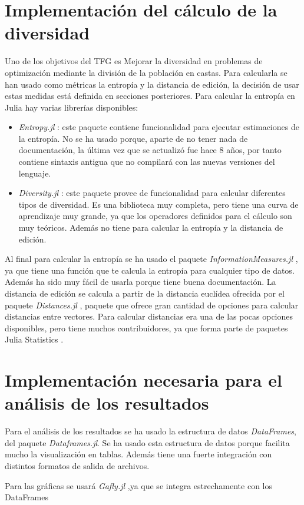 \section{Implementación del cálculo de la diversidad}

Uno de los objetivos del TFG es Mejorar la diversidad en problemas de optimización mediante la división de la población en castas.
Para calcularla se han usado como métricas la entropía y la distancia de edición, la decisión de usar estas medidas
está definida en secciones posteriores. Para calcular la entropía en Julia hay varias librerías disponibles:

\begin{itemize}
    \item \emph{Entropy.jl} \cite{entropy_jl}: este paquete contiene funcionalidad para ejecutar estimaciones de la entropía. No se ha usado porque,
    aparte de no tener nada de documentación, la última vez que se actualizó fue hace 8 años, por tanto contiene
    sintaxis antigua que no compilará con las nuevas versiones del lenguaje.
    \item \emph{Diversity.jl} \cite{diversity_jl}: este paquete provee de funcionalidad para calcular diferentes
    tipos de diversidad. Es una biblioteca muy completa, pero tiene una curva de aprendizaje muy grande, ya que los
    operadores definidos para el cálculo son muy teóricos. Además no tiene para calcular la entropía y la distancia
    de edición.
\end{itemize}

Al final para calcular la entropía se ha usado el paquete \emph{InformationMeasures.jl} \cite{informationMeasures_jl}, ya 
que tiene una función que te calcula la entropía para cualquier tipo de datos. Además ha sido muy fácil de usarla porque 
tiene buena documentación. La distancia de edición se calcula a partir de la distancia euclídea ofrecida por el paquete
\emph{Distances.jl} \cite{distances_jl}, paquete que ofrece gran cantidad de opciones para calcular distancias entre vectores.
Para calcular distancias era una de las pocas opciones disponibles, pero tiene muchos contribuidores, ya que forma 
parte de paquetes Julia Statistics \cite{stats_jl}.

\section{Implementación necesaria para el análisis de los resultados}

Para el análisis de los resultados se ha usado la estructura de datos \emph{DataFrames}, del paquete \emph{Dataframes.jl}. Se
ha usado esta estructura de datos porque facilita mucho la visualización en tablas. Además tiene una fuerte
integración con distintos formatos de salida de archivos. 

Para las gráficas se usará \emph{Gafly.jl} \cite{gadfly_jl},ya que se integra estrechamente con los DataFrames